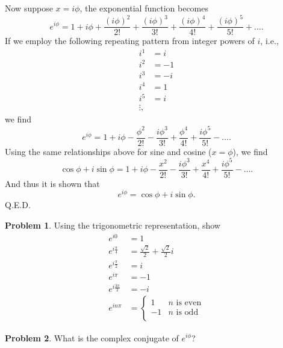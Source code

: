\documentclass[final,a4paper,12pt]{article}
\theoremstyle{definition}
\newtheorem{problem}{Problem}[section]
\begin{document}
Now suppose $x = i \phi$, the exponential function becomes
\begin{equation*}
    e^{i\phi} = 1 + i\phi + \frac{(i\phi)^2}{2!} + \frac{(i\phi)^3}{3!}
        + \frac{(i\phi)^4}{4!} + \frac{(i\phi)^5}{5!} + \ldots .
\end{equation*}
If we employ the following repeating pattern from integer powers of $i$, i.e.,
\begin{align*}
    i^1 &= i \\ 
    i^2 &= -1 \\ 
    i^3 &= -i \\ 
    i^4 &= 1 \\ 
    i^5 &= i \\
    \vdots ,
\end{align*}
we find
\begin{equation*}
    e^{i\phi} = 1 + i\phi - \frac{\phi^2}{2!} - \frac{i \phi^3}{3!}
        + \frac{\phi^4}{4!} + \frac{i \phi^5}{5!} - \ldots .
\end{equation*}
Using the same relationships above for sine and cosine ($x = \phi$), we find
\begin{equation*}
    \cos \phi + i \sin \phi = 
        1 + i\phi - \frac{x^2}{2!} - \frac{i \phi^3}{3!} + \frac{x^4}{4!} 
        + \frac{i \phi^5}{5!} - \ldots .
\end{equation*}
And thus it is shown that
\begin{equation}
    e^{i \phi} = \cos \phi + i \sin \phi .
\end{equation}
Q.E.D.

\begin{problem}
Using the trigonometric representation, show
\begin{align*}
    e^{i0} & = 1 \\
    e^{i \frac{\pi}{4}} & = \frac{\sqrt{2}}{2} + \frac{\sqrt{2}}{2} i \\
    e^{i \frac{\pi}{2}} & = i \\
    e^{i \pi} & = -1 \\
    e^{i \frac{3\pi}{2}} & = -i \\
    e^{i n \pi} &= \begin{cases}
        1 & \text{$n$ is even} \\
        -1 & \text{$n$ is odd} \\
        \end{cases}
\end{align*}
\end{problem}

\begin{problem}
What is the complex conjugate of $e^{i \phi}$?
\end{problem}
\end{document}
